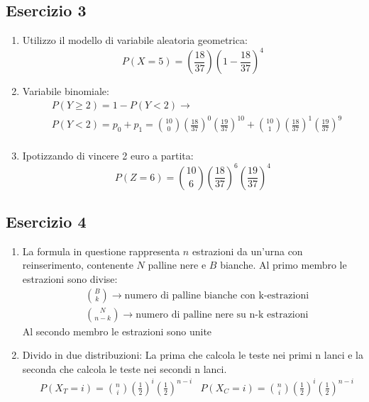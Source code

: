 \documentclass[12pt]{article}
\begin{document}
\subsection*{Esercizio 3}
\begin{enumerate}
    \item Utilizzo il modello di variabile aleatoria geometrica:
    \[
        P(X=5) = \left(\frac{18}{37}\right)\left(1-\frac{18}{37}\right)^{4}
    \]
    \item Variabile binomiale:
    \begin{align*}
        &P(Y \ge 2) = 1 - P(Y < 2) \rightarrow \\
        &P(Y<2) = p_0+p_1 = \binom{10}{0}\left(\frac{18}{37}\right)^0\left(\frac{19}{37}\right)^{10} + \binom{10}{1}\left(\frac{18}{37}\right)^1\left(\frac{19}{37}\right)^9\\
    \end{align*}
    \item Ipotizzando di vincere 2 euro a partita:
    \[
    P(Z = 6) = \binom{10}{6}\left(\frac{18}{37}\right)^6\left(\frac{19}{37}\right)^4    
    \]
\end{enumerate}

\subsection*{Esercizio 4}
\begin{enumerate}
    \item La formula in questione rappresenta \(n\) estrazioni da un'urna con reinserimento,
    contenente \(N\) palline nere e \(B\) bianche. Al primo membro le estrazioni sono divise:
    \begin{align*}
        &\binom{B}{k} \rightarrow \text{numero di palline bianche con k-estrazioni} \\
        &\binom{N}{n-k} \rightarrow \text{numero di palline nere su n-k estrazioni}
    \end{align*}
    Al secondo membro le estrazioni sono unite
    \item Divido in due distribuzioni:
    La prima che calcola le teste nei primi n lanci e la seconda che calcola le teste nei secondi
    n lanci. 
    \begin{align*}
        &P(X_T = i) = \binom{n}{i} (\frac{1}{2})^i(\frac{1}{2})^{n-i}
        &P(X_C = i) = \binom{n}{i} (\frac{1}{2})^i(\frac{1}{2})^{n-i}
    \end{align*}
          
\end{enumerate}
\end{document}
